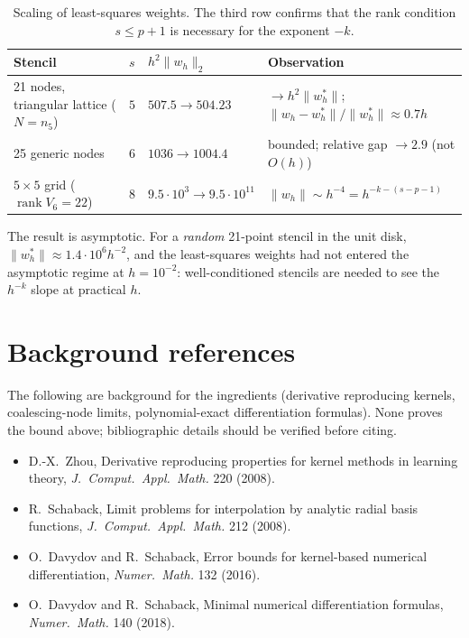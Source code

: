 \documentclass[11pt]{article}
\newcommand{\norm}[1]{\lVert #1\rVert}
\newcommand{\rank}{\operatorname{rank}}
\theoremstyle{plain}
\theoremstyle{definition}
\theoremstyle{remark}
\begin{document}
\begin{table}[h]
\centering
\begin{tabular}{@{}llll@{}}
\toprule
Stencil & $s$ & $h^2\norm{w_h}_2$ & Observation\\
\midrule
21 nodes, triangular lattice ($N=n_5$) & $5$ & $507.5\to504.23$ & $\to h^2\norm{w_h^*}$; $\norm{w_h-w_h^*}/\norm{w_h^*}\approx0.7h$\\
25 generic nodes & $6$ & $1036\to1004.4$ & bounded; relative gap $\to2.9$ (not $O(h)$)\\
$5\times5$ grid ($\rank V_6=22$) & $8$ & $9.5\!\cdot\!10^{3}\to9.5\!\cdot\!10^{11}$ & $\norm{w_h}\sim h^{-4}=h^{-k-(s-p-1)}$\\
\bottomrule
\end{tabular}
\caption{Scaling of least-squares weights. The third row confirms that the rank condition $s\le p+1$ is necessary for the exponent $-k$.}
\label{tab:num}
\end{table}

The result is asymptotic. For a \emph{random} 21-point stencil in the unit disk, $\norm{w_h^*}\approx1.4\cdot10^{6}h^{-2}$, and the least-squares weights had not entered the asymptotic regime at $h=10^{-2}$: well-conditioned stencils are needed to see the $h^{-k}$ slope at practical $h$.

\section*{Background references}
The following are background for the ingredients (derivative reproducing kernels, coalescing-node limits, polynomial-exact differentiation formulas). None proves the bound above; bibliographic details should be verified before citing.
\begin{itemize}[leftmargin=*]
\item D.-X.\ Zhou, Derivative reproducing properties for kernel methods in learning theory, \emph{J.\ Comput.\ Appl.\ Math.} 220 (2008).
\item R.\ Schaback, Limit problems for interpolation by analytic radial basis functions, \emph{J.\ Comput.\ Appl.\ Math.} 212 (2008).
\item O.\ Davydov and R.\ Schaback, Error bounds for kernel-based numerical differentiation, \emph{Numer.\ Math.} 132 (2016).
\item O.\ Davydov and R.\ Schaback, Minimal numerical differentiation formulas, \emph{Numer.\ Math.} 140 (2018).
\end{itemize}
\end{document}

